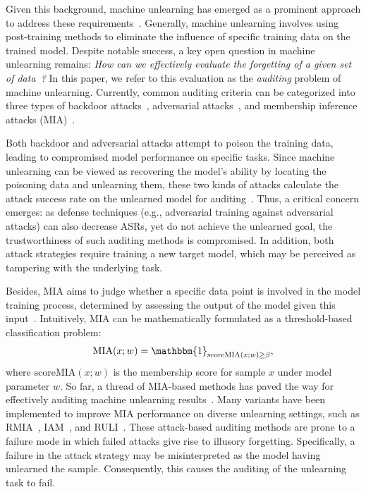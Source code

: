 \documentclass{article}
\theoremstyle{plain}
\theoremstyle{definition}
\theoremstyle{remark}
\begin{document}
Given this background, machine unlearning has emerged as a prominent approach to address these requirements~\cite{unlearningicml1,unlearningicml2,wu2025reliable}. Generally, machine unlearning involves using post-training methods to eliminate the influence of specific training data on the trained model. Despite notable success, a key open question in machine unlearning remains: \emph{How can we effectively
evaluate the forgetting of a given set of data~\cite{nounealrning,nounlearning1}?}
In this paper, we refer to this evaluation as the \emph{auditing} problem of machine unlearning. Currently, common auditing criteria can be categorized into three types of backdoor attacks~\cite{back1,backdoor}, adversarial attacks~\cite{duikang1,duikang}, and membership inference attacks (MIA)~\cite{MIA,MIA2}.


Both backdoor and adversarial attacks attempt to poison the training data, leading to compromised model performance on specific tasks. Since machine unlearning can be viewed as recovering the model's ability by locating the poisoning data and unlearning them, these two kinds of attacks calculate the attack success rate  on the unlearned model for auditing~\cite{backandduikang}. Thus, a critical concern emerges: as defense techniques (e.g., adversarial training against adversarial attacks) can also decrease ASRs, yet do not achieve the unlearned goal, the trustworthiness of such auditing methods is compromised.
In addition, both attack strategies require training a new target model, which may be perceived as tampering with the underlying task.




Besides, MIA aims to judge whether a specific data point is involved in the model training process, determined by assessing the output of the model given this input~\cite{miaCCS}. Intuitively, MIA can be mathematically formulated as a threshold-based classification problem:
\begin{equation}
    \text{MIA}(x;w)=\mathbbm{1}_{\text{scoreMIA}(x;w)\ge \beta},
\end{equation}
where $\text{scoreMIA}(x;w)$ is the membership score for sample $x$ under model parameter $w$. So far, a thread of MIA-based methods has paved the way for effectively auditing machine unlearning results~\cite{Miawhite}. Many variants have been implemented to improve MIA performance on diverse unlearning settings, such as  RMIA~\cite{RMIA}, IAM~\cite{IAM}, and RULI~\cite{newmia1}.
These attack-based auditing methods are prone to a failure mode in which failed attacks give rise to illusory forgetting.
Specifically, a failure in the attack strategy may be misinterpreted as the model having unlearned the sample. Consequently, this causes the auditing of the unlearning task to fail.
\end{document}
